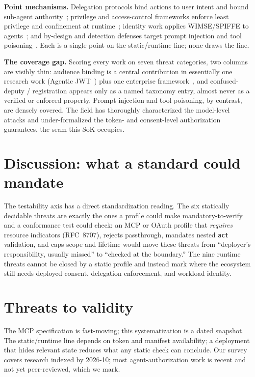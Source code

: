 \noindent\textbf{Point mechanisms.} Delegation protocols bind actions to user intent
and bound sub-agent authority~\cite{agentauth2025agenticjwt,agentauth2026aip,agentauth2026boundedagents,agentauth2026aidguard,agentauth2026sudp};
privilege and access-control frameworks enforce least privilege and confinement at
runtime~\cite{agentauth2025progent,agentauth2026preaction,agentauth2026mac,agentauth2024isolategpt,agentauth2025saga};
identity work applies WIMSE/SPIFFE to agents~\cite{agentauth2026aiidentity,agentauth2026ehv,agentauth2026ldp};
and by-design and detection defenses target prompt injection and tool
poisoning~\cite{agentauth2025camel,agentauth2024agentdojo,agentauth2025mcptox,agentauth2026trustdesc,agentauth2026noboxmcp}.
Each is a single point on the static/runtime line; none draws the line.

\noindent\textbf{The coverage gap.} Scoring every work on seven threat categories,
two columns are visibly thin: audience binding is a central contribution in
essentially one research work (Agentic JWT~\cite{agentauth2025agenticjwt}) plus one
enterprise framework~\cite{agentauth2025enterprisemcp}, and confused-deputy /
registration appears only as a named taxonomy entry, almost never as a verified or
enforced property. Prompt injection and tool poisoning, by contrast, are densely
covered. The field has thoroughly characterized the model-level attacks and
under-formalized the token- and consent-level authorization guarantees, the seam
this SoK occupies.

\section{Discussion: what a standard could mandate}\label{sec:disc}
The testability axis has a direct standardization reading. The six statically
decidable threats are exactly the ones a profile could make mandatory-to-verify and a
conformance test could check: an MCP or OAuth profile that \emph{requires} resource
indicators (RFC~8707), rejects passthrough, mandates nested \texttt{act} validation,
and caps scope and lifetime would move these threats from ``deployer's
responsibility, usually missed'' to ``checked at the boundary.'' The nine runtime
threats cannot be closed by a static profile and instead mark where the ecosystem
still needs deployed consent, delegation enforcement, and workload identity.

\section{Threats to validity}
The MCP specification is fast-moving; this systematization is a dated snapshot. The
static/runtime line depends on token and manifest availability; a deployment that
hides relevant state reduces what any static check can conclude. Our survey covers
research indexed by 2026-10; most agent-authorization work is recent and not yet
peer-reviewed, which we mark. 

